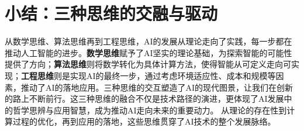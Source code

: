 \section{ 小结：三种思维的交融与驱动}



从数学思维、算法思维再到工程思维，AI的发展从理论走向了实践，每一步都在推动人工智能的进步。{\bf 数学思维}赋予了AI坚实的理论基础，为探索智能的可能性提供了方向；{\bf 算法思维}则将数学转化为具体计算方法，使得智能从可定义走向可实现；{\bf 工程思维}则是实现AI的最终一步，通过考虑环境适应性、成本和规模等因素，推动了AI的落地应用。三种思维的交互塑造了AI的现代图景，让我们在创新的路上不断前行。这三种思维的融合不仅是技术路径的演进，更体现了AI发展中的哲学思辨与应用智慧，成为推动AI走向未来的重要动力。
从理论的存在性到计算过程的优化，再到应用的落地，这些思维贯穿了AI技术的整个发展脉络。
\nocite{*}
\newpage
